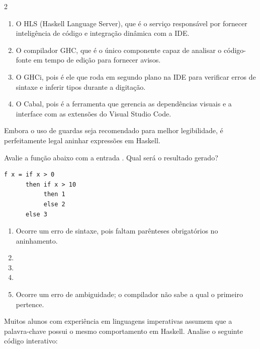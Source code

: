 \documentclass[a4paper,10pt,brazil]{article}
\begin{document}
\begin{multicols}{2}
\begin{enumerate}
  \item O HLS (Haskell Language Server), que é o serviço responsável por fornecer inteligência de código e integração dinâmica com a IDE.

  \item O compilador GHC, que é o único componente capaz de analisar o código-fonte em tempo de edição para fornecer avisos.

  \item O GHCi, pois é ele que roda em segundo plano na IDE para verificar erros de sintaxe e inferir tipos durante a digitação.

  \item O Cabal, pois é a ferramenta que gerencia as dependências visuais e a interface com as extensões do Visual Studio Code.


\end{enumerate}

Embora o uso de guardas seja recomendado para melhor legibilidade, é perfeitamente legal aninhar expressões  em Haskell. 

Avalie a função abaixo com a entrada . Qual será o resultado gerado?
\begin{verbatim}
f x = if x > 0
      then if x > 10
           then 1
           else 2
      else 3
\end{verbatim}

\begin{enumerate}
  \item Ocorre um erro de sintaxe, pois faltam parênteses obrigatórios no aninhamento.

  \item {}

  \item {}

  \item {}

  \item Ocorre um erro de ambiguidade; o compilador não sabe a qual  o primeiro  pertence.


\end{enumerate}

Muitos alunos com experiência em linguagens imperativas assumem que a palavra-chave  possui o mesmo comportamento em Haskell. Analise o seguinte código interativo:


\end{multicols}
\end{document}
